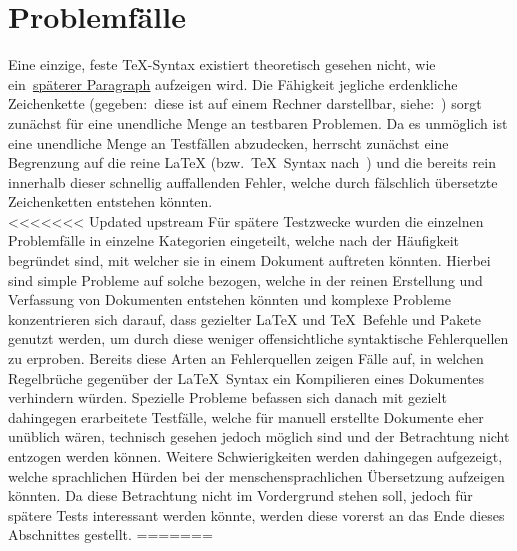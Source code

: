 
\section{Problemfälle}
Eine einzige, feste \TeX{}-Syntax existiert theoretisch gesehen nicht, wie ein~\hyperref[par:catcode]{späterer Paragraph} aufzeigen wird.%
Die Fähigkeit jegliche erdenkliche Zeichenkette (gegeben:\ diese ist auf einem Rechner darstellbar, siehe:~\cite{unicode}) sorgt zunächst für eine unendliche Menge an testbaren Problemen. Da es unmöglich ist eine unendliche Menge an Testfällen abzudecken, herrscht zunächst eine Begrenzung auf die reine \LaTeX{} (bzw.\ \TeX{}~Syntax nach~\cite{texbook}) und die bereits rein innerhalb dieser schnellig auffallenden Fehler, welche durch fälschlich übersetzte Zeichenketten entstehen könnten.\\\noindent
<<<<<<< Updated upstream
Für spätere Testzwecke wurden die einzelnen Problemfälle in einzelne Kategorien eingeteilt, welche nach der Häufigkeit begründet sind, mit welcher sie in einem Dokument auftreten könnten. Hierbei sind simple Probleme auf solche bezogen, welche in der reinen Erstellung und Verfassung von Dokumenten entstehen könnten und komplexe Probleme konzentrieren sich darauf, dass gezielter \LaTeX{} und \TeX{}~Befehle und Pakete genutzt werden, um durch diese weniger offensichtliche syntaktische Fehlerquellen zu erproben. Bereits diese Arten an Fehlerquellen zeigen Fälle auf, in welchen Regelbrüche gegenüber der \LaTeX{}~Syntax ein Kompilieren eines Dokumentes verhindern würden. Spezielle Probleme befassen sich danach mit gezielt dahingegen erarbeitete Testfälle, welche für manuell erstellte Dokumente eher unüblich wären, technisch gesehen jedoch möglich sind und der Betrachtung nicht entzogen werden können. Weitere Schwierigkeiten werden dahingegen aufgezeigt, welche sprachlichen Hürden bei der menschensprachlichen Übersetzung aufzeigen könnten. Da diese Betrachtung nicht im Vordergrund stehen soll, jedoch für spätere Tests interessant werden könnte, werden diese vorerst an das Ende dieses Abschnittes gestellt.%
=======
